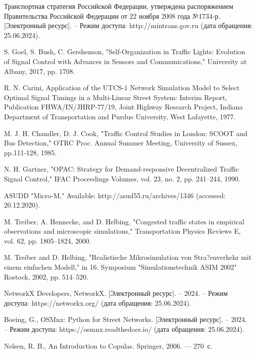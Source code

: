 \documentclass[11pt]{ubs}
\begin{document}
\newpage
\begin{thebibliography}{10}
   Транспортная стратегия Российской Федерации, утверждена распоряжением Правительства Российской Федерации от 22 ноября 2008 года №1734-р. [Электронный ресурс]. – Режим доступа: {http://mintrans.gov.ru} (дата обращения: 25.06.2024).

   S. Goel, S. Bush, C. Gershenson, "Self-Organization in Traffic Lights: Evolution of Signal Control with Advances in Sensors and Communications," University at Albany,  2017, pp. 1708.

   R. N. Carini, {Application of the UTCS-1 Network Simulation Model to Select Optimal Signal Timings in a Multi-Linear Street System: Interim Report}, Publication FHWA/IN/JHRP-77/19, Joint Highway Research Project, Indiana Department of Transportation and Purdue University, West Lafayette, 1977.

   M. J. H. Chandler, D. J. Cook, "Traffic Control Studies in London: SCOOT and Bus Detection," OTRC Proc. Annual Summer Meeting, University of Sussex,  pp.111-128, 1985.

   N. H. Gartner, "OPAC: Strategy for Demand-responsive Decentralized Traffic Signal Control," IFAC Proceedings Volumes, vol. 23, no. 2, pp. 241–244, 1990. 

   ASUDD "Micro-M," Available: {http://asud55.ru/archives/1346} (accessed: 20.12.2020).


   M. Treiber, A. Hennecke, and D. Helbing, "Congested traffic states in empirical observations and microscopic simulations," {Transportation Physics Reviews E}, vol. 62, pp. 1805–1824, 2000.

   M. Treiber and D. Helbing, "Realistische Mikrosimulation von Stra?enverkehr mit einem einfachen Modell," in {16. Symposium "Simulationstechnik ASIM 2002" Rostock}, 2002, pp. 514–520.

   NetworkX Developers, {NetworkX}. [Электронный ресурс]. – 2024. – Режим доступа: {https://networkx.org/} (дата обращения: 25.06.2024).

   Boeing, G., {OSMnx: Python for Street Networks}. [Электронный ресурс]. – 2024. – Режим доступа: {https://osmnx.readthedocs.io/} (дата обращения: 25.06.2024).


  
   Nelsen, R. B., {An Introduction to Copulas}. Springer, 2006. — 270~с.


\end{thebibliography}
\end{document}
